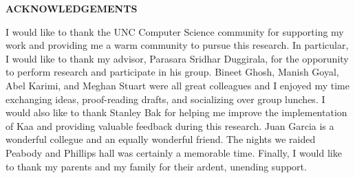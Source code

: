 
\begin{center}
\vspace*{52pt}
{\fontsize{12pt}{14.4pt}\selectfont \textbf{ACKNOWLEDGEMENTS}}
\end{center}

I would like to thank the UNC Computer Science community for supporting my work and providing me a warm community to pursue this research. In particular, I would like to thank my advisor, Parasara Sridhar Duggirala, for the opporunity to perform research and participate in his group.
%
%
Bineet Ghosh, Manish Goyal, Abel Karimi, and Meghan Stuart were all great colleagues and I enjoyed my time exchanging ideas, proof-reading drafts, and socializing over group lunches. I would also like to thank Stanley Bak for helping me improve the implementation of Kaa and providing valuable feedback during this research. Juan Garcia is a wonderful collegue and an equally wonderful friend. The nights we raided Peabody and Phillips hall was certainly a memorable time. Finally, I would like to thank my parents and my family for their ardent, unending support.

\clearpage
